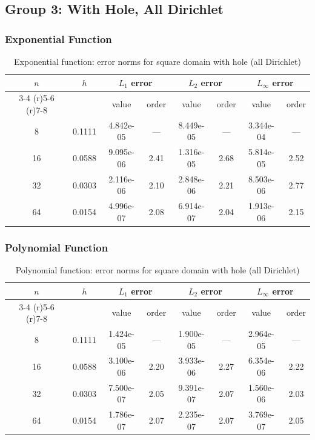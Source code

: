 \documentclass[12pt,a4paper]{article}
\begin{document}
\subsection{Group 3: With Hole, All Dirichlet}

\subsubsection{Exponential Function}
\begin{table}[H]
\centering
\caption{Exponential function: error norms for square domain with hole (all Dirichlet)}
\begin{tabular}{cccccccc}
\toprule
$n$ & $h$ & \multicolumn{2}{c}{$L_1$ error} & \multicolumn{2}{c}{$L_2$ error} & \multicolumn{2}{c}{$L_\infty$ error} \\
\cmidrule(r){3-4} \cmidrule(r){5-6} \cmidrule(r){7-8}
& & value & order & value & order & value & order \\
\midrule
8  & 0.1111 & 4.842e-05 & --- & 8.449e-05 & --- & 3.344e-04 & --- \\
16 & 0.0588 & 9.095e-06 & 2.41 & 1.316e-05 & 2.68 & 5.814e-05 & 2.52 \\
32 & 0.0303 & 2.116e-06 & 2.10 & 2.848e-06 & 2.21 & 8.503e-06 & 2.77 \\
64 & 0.0154 & 4.996e-07 & 2.08 & 6.914e-07 & 2.04 & 1.913e-06 & 2.15 \\
\bottomrule
\end{tabular}
\end{table}

\subsubsection{Polynomial Function}
\begin{table}[H]
\centering
\caption{Polynomial function: error norms for square domain with hole (all Dirichlet)}
\begin{tabular}{cccccccc}
\toprule
$n$ & $h$ & \multicolumn{2}{c}{$L_1$ error} & \multicolumn{2}{c}{$L_2$ error} & \multicolumn{2}{c}{$L_\infty$ error} \\
\cmidrule(r){3-4} \cmidrule(r){5-6} \cmidrule(r){7-8}
& & value & order & value & order & value & order \\
\midrule
8  & 0.1111 & 1.424e-05 & --- & 1.900e-05 & --- & 2.964e-05 & --- \\
16 & 0.0588 & 3.100e-06 & 2.20 & 3.933e-06 & 2.27 & 6.354e-06 & 2.22 \\
32 & 0.0303 & 7.500e-07 & 2.05 & 9.391e-07 & 2.07 & 1.560e-06 & 2.03 \\
64 & 0.0154 & 1.786e-07 & 2.07 & 2.235e-07 & 2.07 & 3.769e-07 & 2.05 \\
\bottomrule
\end{tabular}
\end{table}
\end{document}
